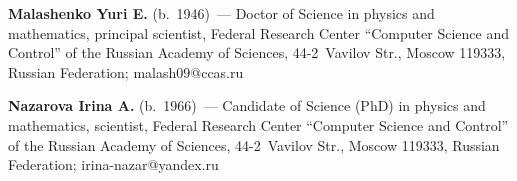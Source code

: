 \Contr

\noindent
\textbf{Malashenko Yuri E.} (b.\ 1946)~--- Doctor of Science in physics and mathematics, principal 
scientist, Federal Research Center ``Computer Science and Control'' of the Russian Academy of 
Sciences, 
44-2~Vavilov Str., Moscow 119333, Russian Federation; \mbox{malash09@ccas.ru}

\vspace*{3pt} 

\noindent
\textbf{Nazarova Irina A.} (b.\ 1966)~---  Candidate of Science (PhD) in physics and mathematics, 
scientist, Federal Research Center ``Computer Science and Control'' of the Russian Academy of 
Sciences, 
44-2~Vavilov Str., Moscow 119333, Russian Federation; \mbox{irina-nazar@yandex.ru}



\label{end\stat}

\renewcommand{\bibname}{\protect\rm Литература} 
      